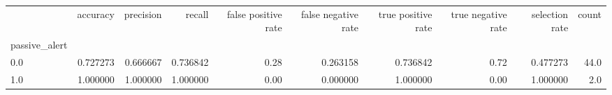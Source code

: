 \begin{tabular}{lrrrrrrrrr}
\toprule
{} &  accuracy &  precision &    recall &  false positive rate &  false negative rate &  true positive rate &  true negative rate &  selection rate &  count \\
passive\_alert &           &            &           &                      &                      &                     &                     &                 &        \\
\midrule
0.0           &  0.727273 &   0.666667 &  0.736842 &                 0.28 &             0.263158 &            0.736842 &                0.72 &        0.477273 &   44.0 \\
1.0           &  1.000000 &   1.000000 &  1.000000 &                 0.00 &             0.000000 &            1.000000 &                0.00 &        1.000000 &    2.0 \\
\bottomrule
\end{tabular}

